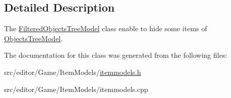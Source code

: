 \subsection{\-Detailed \-Description}
\-The \hyperlink{class_filtered_objects_tree_model}{\-Filtered\-Objects\-Tree\-Model} class enable to hide some items of \hyperlink{class_objects_tree_model}{\-Objects\-Tree\-Model}. 

\-The documentation for this class was generated from the following files\-:\begin{DoxyCompactItemize}
\item 
src/editor/\-Game/\-Item\-Models/\hyperlink{itemmodels_8h}{itemmodels.\-h}\item 
src/editor/\-Game/\-Item\-Models/itemmodels.\-cpp\end{DoxyCompactItemize}
